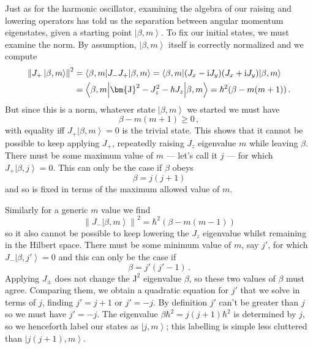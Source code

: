\documentclass{article}
\theoremstyle{plain}\theoremheaderfont{\normalfont\itshape}\theorembodyfont{\rmfamily}\theoremseparator{.}\newtheorem*{rem}{Remark}\newtheorem*{ex}{Example}\newtheorem*{proof}{Proof}\newtheorem*{altp}{Alternative proof}
\theoremstyle{plain}\theoremheaderfont{\normalfont\bfseries}\theorembodyfont{\rmfamily}\theoremseparator{.}\newtheorem{thm}{Theorem}[section]\newtheorem{lem}[thm]{Lemma}\newtheorem{prop}[thm]{Proposition}\newtheorem*{cor}{Corollary}\newtheorem{defn}[thm]{Definition}\newtheorem{clm}[thm]{Claim}\newtheorem{clminproof}{Claim}
\theoremstyle{break}\theoremheaderfont{\normalfont\itshape}\theorembodyfont{\rmfamily}\theoremseparator{.\medskip}\newtheorem*{proofskip}{Proof}\newtheorem*{exs}{Examples}\newtheorem*{rems}{Remarks}
\theoremstyle{break}\theoremheaderfont{\normalfont\bfseries}\theorembodyfont{\rmfamily}\theoremseparator{.\medskip}\newtheorem{lemskip}[thm]{Lemma}\newtheorem{defnskip}[thm]{Definition}\newtheorem{propskip}[thm]{Proposition}\newtheorem{thmskip}[thm]{Theorem}
\numberwithin{equation}{section}
\newcommand{\ii}{\mathrm{i}}
\newcommand{\ket}[1]{\left| #1 \right\rangle}
\newcommand{\expval}[2]{\left\langle #2 \middle| #1 \middle| #2 \right\rangle}
\newcommand{\vb}[1]{\bm{\mathrm{#1}}}
\newcommand{\norm}[1]{\left\| #1 \right\|}
\begin{document}
    Just as for the harmonic oscillator, examining the algebra of our raising and lowering operators has told us the separation between angular momentum eigenstates, given a starting point \(\ket{\beta,m}\). To fix our initial states, we must examine the norm. By assumption, \(\ket{\beta,m}\) itself is correctly normalized and we compute
    \begin{align}
        \norm{J_+\ket{\beta,m}}^2&=\expval{J_-J_+}{\beta,m}=\expval{(J_x-\ii J_y)(J_x+\ii J_y)}{\beta,m}\notag\\
        &=\expval{\vb{J}^2-J_z^2-\hbar J_z}{\beta,m}=\hbar^2(\beta-m(m+1))\,.
    \end{align}
    But since this is a norm, whatever state \(\ket{\beta,m}\) we started we must have
    \begin{equation}
        \beta-m(m+1)\ge 0\,,
    \end{equation}
    with equality iff \(J_+\ket{\beta,m}=0\) is the trivial state. This shows that it cannot be possible to keep applying \(J_+\), repeatedly raising \(J_z\) eigenvalue \(m\) while leaving \(\beta\). There must be some maximum value of \(m\) --- let's call it \(j\) --- for which \(J_+\ket{\beta,j}=0\). This can only be the case if \(\beta\) obeys
    \begin{equation}
        \beta=j(j+1)
    \end{equation}
    and so is fixed in terms of the maximum allowed value of \(m\).

    Similarly for a generic \(m\) value we find
    \begin{equation}
        \norm{J_-\ket{\beta,m}}^2=\hbar^2(\beta-m(m-1))
    \end{equation}
    so it also cannot be possible to keep lowering the \(J_z\) eigenvalue whilst remaining in the Hilbert space. There must be some minimum value of \(m\), say \(j'\), for which \(J_-\ket{\beta,j'}=0\) and this can only be the case if
    \begin{equation}
        \beta=j'(j'-1)\,.
    \end{equation}
    Applying \(J_\pm\) does not change the \(\vb{J}^2\) eigenvalue \(\beta\), so these two values of \(\beta\) must agree. Comparing them, we obtain a quadratic equation for \(j'\) that we solve in terms of \(j\), finding \(j'=j+1\) or \(j'=-j\). By definition \(j'\) can't be greater than \(j\) so we must have \(j'=-j\). The eigenvalue \(\beta\hbar^2=j(j+1)\hbar^2\) is determined by \(j\), so we henceforth label our states as \(\ket{j,m}\); this labelling is simple less cluttered than \(\ket{j(j+1),m}\).
    
\end{document}
